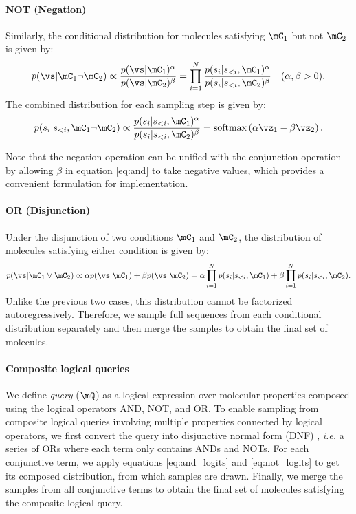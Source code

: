 \paragraph{NOT (Negation)}
Similarly, the conditional distribution for molecules satisfying $\mC_1$ but not $\mC_2$ is given by:
\begin{equation}
\label{eq:not}
    p(\vs | \mC_1 \lnot \mC_2) \propto \frac{p(\vs | \mC_1)^\alpha}{p(\vs | \mC_2)^\beta} = \prod_{i=1}^{N}  \frac{p(s_i | s_{<i}, \mC_1)^\alpha}{p(s_i | s_{<i}, \mC_2)^\beta} \quad (\alpha, \beta > 0).
\end{equation}
The combined distribution for each sampling step is given by:
\begin{equation}
\label{eq:not_logits}
    p(s_i | s_{<i}, \mC_1 \lnot \mC_2) \propto \frac{p(s_i | s_{<i}, \mC_1)^\alpha}{p(s_i | s_{<i}, \mC_2)^\beta} = \operatorname{softmax}\left( \alpha \vz_1 - \beta \vz_2 \right).
\end{equation}

Note that the negation operation can be unified with the conjunction operation by allowing $\beta$ in equation \ref{eq:and} to take negative values, which provides a convenient formulation for implementation.

\paragraph{OR (Disjunction)}
Under the disjunction of two conditions $\mC_1$ and $\mC_2$, the distribution of molecules satisfying either condition is given by:
\begin{equation}
    p(\vs | \mC_1 \lor \mC_2) \propto \alpha p(\vs | \mC_1) + \beta p(\vs | \mC_2) = \alpha \prod_{i=1}^{N} p(s_i | s_{<i}, \mC_1)
    + \beta \prod_{i=1}^{N} p(s_i | s_{<i}, \mC_2).
\end{equation}
Unlike the previous two cases, this distribution cannot be factorized autoregressively. Therefore, we sample full sequences from each conditional distribution separately and then merge the samples to obtain the final set of molecules.

\paragraph{Composite logical queries}
We define \textit{query} ($\mQ$) as a logical expression over molecular properties composed using the logical operators AND, NOT, and OR.
To enable sampling from composite logical queries involving multiple properties connected by logical operators, we first convert the query into disjunctive normal form (DNF) \citep{rosen2019discrete}, \textit{i.e.} a series of ORs where each term only contains ANDs and NOTs.
For each conjunctive term, we apply equations \ref{eq:and_logits} and \ref{eq:not_logits} to get its composed distribution, from which samples are drawn.
Finally, we merge the samples from all conjunctive terms to obtain the final set of molecules satisfying the composite logical query.

